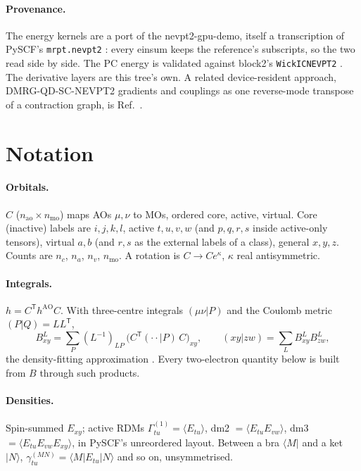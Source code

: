 \documentclass[11pt]{article}
\newcommand{\code}[1]{\texttt{#1}}
\newcommand{\G}[1]{\Gamma^{(#1)}}
\newcommand{\T}{\mathsf T}
\begin{document}
\paragraph{Provenance.} The energy kernels are a port of the
nevpt2-gpu-demo, itself a transcription of PySCF's \code{mrpt.nevpt2}
\cite{pyscf2020}: every einsum keeps the reference's subscripts, so the two
read side by side. The PC energy is validated against block2's
\code{WickICNEVPT2} \cite{block2}. The derivative layers are this tree's own.
A related device-resident approach, DMRG-QD-SC-NEVPT2 gradients and
couplings as one reverse-mode transpose of a contraction graph, is
Ref.~\cite{guerrero2026}.

\section{Notation}
\label{sec:notation}

\paragraph{Orbitals.} $C$ ($n_{\mathrm{ao}}\times n_{\mathrm{mo}}$) maps AOs
$\mu,\nu$ to MOs, ordered core, active, virtual. Core (inactive) labels are
$i,j,k,l$, active $t,u,v,w$ (and $p,q,r,s$ inside active-only tensors),
virtual $a,b$ (and $r,s$ as the external labels of a class), general
$x,y,z$. Counts are $n_c$, $n_a$, $n_v$, $n_{\mathrm{mo}}$. A rotation is
$C \to C e^{\kappa}$, $\kappa$ real antisymmetric.

\paragraph{Integrals.} $h = C^\T h^{\mathrm{AO}} C$. With three-centre
integrals $(\mu\nu|P)$ and the Coulomb metric $(P|Q) = LL^\T$,
\begin{equation}
  B^{L}_{xy} = \sum_P (L^{-1})_{LP}\,\bigl(C^\T (\cdot\cdot|P)\, C\bigr)_{xy},\qquad
  (xy|zw) = \sum_L B^L_{xy} B^L_{zw},
  \label{eq:B}
\end{equation}
the density-fitting approximation \cite{vahtras1993}. Every two-electron
quantity below is built from $B$ through such products.

\paragraph{Densities.} Spin-summed $E_{xy}$; active RDMs
$\G1_{tu} = \langle E_{tu}\rangle$, dm2 $= \langle E_{tu}E_{vw}\rangle$, dm3
$= \langle E_{tu}E_{vw}E_{xy}\rangle$, in PySCF's unreordered layout. Between
a bra $\langle M|$ and a ket $|N\rangle$, $\gamma^{(MN)}_{tu} =
\langle M|E_{tu}|N\rangle$ and so on, unsymmetrised.
\end{document}
